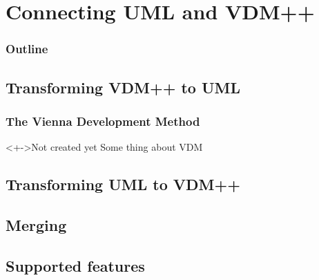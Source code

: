 %
%
\section{Connecting UML and VDM++}
%
%
\begin{frame}
  \frametitle{Outline}
  \tableofcontents[current]
\end{frame}





\subsection{Transforming VDM++ to UML}

%
%
\frame
{
  \frametitle{The Vienna Development Method}

\begin{center}
	\begin{block}<+->{Not created yet}
	Some thing about VDM
	\end{block}

\end{center}
}


\subsection{Transforming UML to VDM++}




\subsection{Merging}




\subsection{Supported features}

